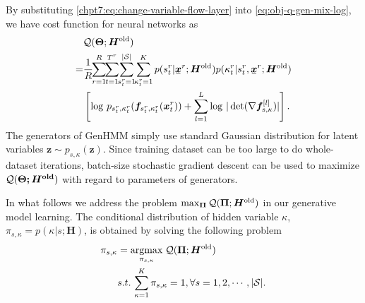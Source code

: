 By substituting \eqref{chpt7:eq:change-variable-flow-layer} into \eqref{eq:obj-q-gen-mix-log}, we have cost function for neural networks as
\begin{align}\label{eq:obj-q-gen-mix}
  &\Qq(\bm{\Theta}; \bm{H}^{\mathrm{old}}) \nonumber \\
  =& \frac{1}{R}\hspace{-3pt}\sum_{r=1}^{R}\hspace{-3pt} \sum_{t=1}^{{T}^{r}}\hspace{-3pt} \sum_{\smtr{s}{t}{r}=1}^{|\Ss|} \hspace{-3pt} \sum_{\smtr{\kappa}{t}{r}=1}^{K}p(\smtr{s}{t}{r}| \ubmr{x}{r}; \bm{H}^{\mathrm{old}})p(\smtr{\kappa}{t}{r}|\smtr{s}{t}{r}, \ubmr{x}{r}; \bm{H}^{\mathrm{old}}) \nonumber\\
  &\left[ \log\, p_{\smtr{s}{t}{r}, \smtr{\kappa}{t}{r}}(\bm{f}_{\smtr{s}{t}{r}, \smtr{\kappa}{t}{r}}(\bmtr{x}{t}{r})) + \sum_{l=1}^{L}\log\,| \det (\nabla{\bm{f}_{s,\kappa}^{[l]}})|\right].
\end{align}
The generators of GenHMM simply use standard Gaussian distribution for latent variables $\bm{z} \sim p_{s,\kappa}(\bm{z})$. Since training dataset can be too large to do whole-dataset iterations, batch-size stochastic gradient descent can be used to maximize $\mathcal{Q}(\bm{\Theta; \bm{H}^{\mathrm{old}}})$ with regard to parameters of generators.

In what follows we address the problem $\max_{\bm{\Pi}} \mathcal{Q}(\bm{\Pi}; \bm{H}^{\mathrm{old}})$ in our generative model learning. The conditional distribution of hidden variable $\kappa$, $\pi_{s, \kappa} = p(\kappa | s; \bm{H})$, is obtained by solving the following problem
\begin{align}\label{opm:pi}
  \pi_{s, \kappa} & = \underset{\pi_{s, \kappa}}{\operatorname{argmax}}\; \mathcal{Q}(\bm{\Pi}; \bm{H}^{\mathrm{old}}) \\ \nonumber
                  & s.t. \, \sum_{\kappa=1}^{K} \pi_{s, \kappa}= 1, \forall s = 1, 2, \cdots, |\mathcal{S}|. 
\end{align}

